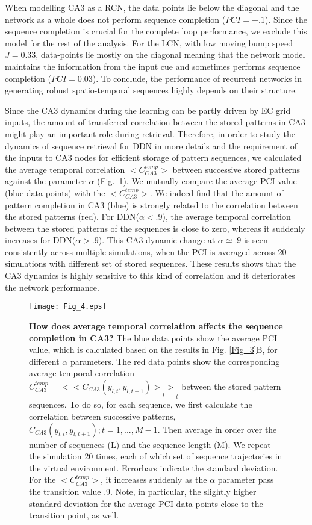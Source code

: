 \documentclass[utf8]{frontiersSCNS} %
\begin{document}
When modelling CA3 as a RCN, the data points lie below the diagonal and the network as a whole does not perform sequence completion ($PCI = -.1$).
%
Since the sequence completion is crucial for the complete loop performance, we exclude this model for the rest of the analysis.
%
For the LCN, with low moving bump speed $J = 0.33$, data-points lie mostly on the diagonal meaning that the network model maintains the information from the input cue and sometimes performs sequence completion ($PCI = 0.03$). 
%
To conclude, the performance of recurrent networks in generating robust spatio-temporal sequences highly depends on their structure. 


Since the CA3 dynamics during the learning can be partly driven by EC grid inputs, the amount of transferred correlation between the stored patterns in CA3 might play an important role during retrieval. 
Therefore, in order to study the dynamics of sequence retrieval for DDN in more details and the requirement of the inputs to CA3 nodes for efficient storage of pattern sequences, we calculated the average temporal correlation $ <C^{temp}_{CA3}>$ between successive stored patterns against the parameter $\alpha$ (Fig.~\ref{Fig_4}). 
%
We mutually compare the average PCI value (blue data-points) with the $ <C^{temp}_{CA3}>$.
%
We indeed find that the amount of pattern completion in CA3 (blue) is strongly related to the correlation between the stored patterns (red). 
For DDN($\alpha < .9$), the average temporal correlation between the stored patterns of the sequences is close to zero, whereas it suddenly increases for DDN($\alpha > .9$). 
%
This CA3 dynamic change at $\alpha \simeq .9$ is seen consistently across multiple simulations, when the PCI is averaged across 20 simulations with different set of stored sequences.   
%
These results shows that the CA3 dynamics is highly sensitive to this kind of correlation and it deteriorates the network performance.

\begin{figure}[!htb]
\centering\texttt{[image: Fig\_4.eps]}
\caption{\textbf{How does average temporal correlation affects the sequence completion in CA3?} 
The blue data points show the average PCI value, which is calculated based on the results in Fig. \ref{Fig_3}B, for different $\alpha$ parameters. The red data points show the corresponding average temporal correlation $C^{temp}_{CA3} = {<{<C_{CA3}(y_{l,t}, y_{l,t+1})>}_l>}_t$ between the stored pattern sequences. To do so, for each sequence, we first calculate the correlation between successive patterns, $C_{CA3}(y_{l,t}, y_{l,t+1}); t = 1, ..., M-1$. Then average in order over the number of sequences (L) and the sequence length (M). We repeat the simulation 20 times, each of which set of sequence trajectories in the virtual environment. Errorbars indicate the standard deviation. For the $<C^{temp}_{CA3} >$, it increases suddenly as the $\alpha$ parameter pass the transition value .9.
Note, in particular, the slightly higher standard deviation for the average PCI data points close to the transition point, as well.  
}
\label{Fig_4}
\end{figure}
\end{document}

